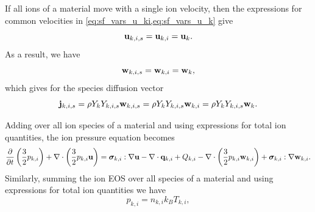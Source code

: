 \documentclass[a4paper,11pt]{report}
\begin{document}
If all ions of a material move with a single ion velocity, then the expressions for common velocities in \cref{eq:sf_vars_u_ki,eq:sf_vars_u_k} give 
\begin{equation}
    \mathbf{u}_{k,i,s} = \mathbf{u}_{k,i} = \mathbf{u}_k.
\end{equation} 
As a result, we have
\begin{equation}
    \mathbf{w}_{k,i,s} = \mathbf{w}_{k,i} = \mathbf{w}_k,
\end{equation} 
which gives for the species diffusion vector
\begin{equation}
    \label{sec:sf_mm_ms_diffusion}
    \mathbf{j}_{k,i,s} = \rho Y_k Y_{k,i,s} \mathbf{w}_{k,i,s} = \rho Y_k Y_{k,i,s} \mathbf{w}_{k,i} = \rho Y_k Y_{k,i,s} \mathbf{w}_k.
\end{equation} 

Adding over all ion species of a material and using expressions for total ion quantities, the ion pressure equation becomes
\begin{equation*}
    \frac{\partial}{\partial t} \left( \frac{3}{2} p_{k,i} \right) + \nabla \cdot \left( \frac{3}{2} p_{k,i} \mathbf{u} \right) = \\ 
    \bm \sigma_{k,i} : \nabla \mathbf{u} - \nabla \cdot \mathbf{q}_{k,i} + Q_{k,i} - \nabla \cdot \left( \frac{3}{2} p_{k,i} \mathbf{w}_{k,i} \right) + \bm \sigma_{k,i} : \nabla \mathbf{w}_{k,i}.
\end{equation*}
Similarly, summing the ion EOS over all species of a material and using expressions for total ion quantities we have
\begin{equation*}
    p_{k,i} = n_{k,i} k_B T_{k,i},
\end{equation*}
\end{document}
